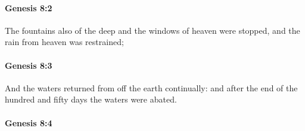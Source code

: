 
		\paragraph{Genesis 8:2} %
			\label{GENESIS-8-2}

			The fountains also of the deep and the windows of heaven were stopped, and the rain from heaven was restrained;


		\paragraph{Genesis 8:3} %
			\label{GENESIS-8-3}

			And the waters returned from off the earth continually: and after the end of the hundred and fifty days the waters were abated.


		\paragraph{Genesis 8:4} %
			\label{GENESIS-8-4}

